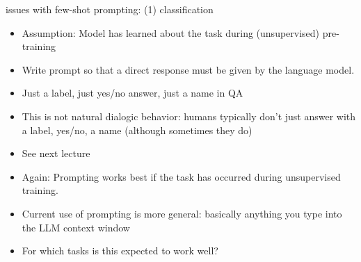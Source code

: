 \begin{frame}{issues with few-shot prompting: (1) classification}

\vfill

\begin{itemize}
    \item Assumption: Model has learned about the task during (unsupervised) pre-training 
    \item Write prompt so that  a direct response must be
    given by the language model.
        \item Just a label, just yes/no answer, just a name
    in QA
    \item This is not natural dialogic behavior: humans
    typically don't
    just answer with a label, yes/no, a name (although
    sometimes they do)
    \item See next lecture
\item Again: Prompting works best if the task has occurred during
unsupervised training.
\item Current use of prompting is more general: basically
anything you type into the LLM context window
    \item \ques For which tasks is this expected to work well?

\end{itemize}

\vfill

\end{frame}


